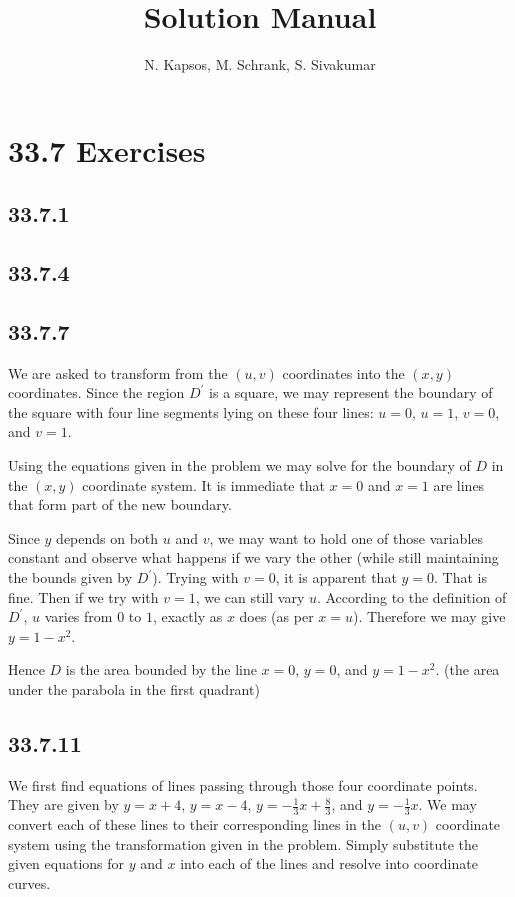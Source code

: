 \documentclass{article}
\title{Solution Manual}
\author{N. Kapsos, M. Schrank, S. Sivakumar}
\date{}
\begin{document}
\maketitle
\setcounter{secnumdepth}{0}

\section{33.7 Exercises}

\subsection{33.7.1}

\subsection{33.7.4}

\subsection{33.7.7}

We are asked to transform from the $(u,v)$ coordinates into the $(x,y)$ coordinates. Since the region $D^{\prime}$ is a square, we may represent the boundary of the square with four line segments lying on these four lines: $u = 0$, $u = 1$, $v = 0$, and $v = 1$.

Using the equations given in the problem we may solve for the boundary of $D$ in the $(x,y)$ coordinate system. It is immediate that $x = 0$ and $x = 1$ are lines that form part of the new boundary.

Since $y$ depends on both $u$ and $v$, we may want to hold one of those variables constant and observe what happens if we vary the other (while still maintaining the bounds given by $D^{\prime}$). Trying with $v = 0$, it is apparent that $y = 0$. That is fine. Then if we try with $v = 1$, we can still vary $u$. According to the definition of $D^{\prime}$, $u$ varies from $0$ to $1$, exactly as $x$ does (as per $x=u$). Therefore we may give $y = 1-x^2$.

Hence $D$ is the area bounded by the line $x=0$, $y=0$, and $y=1-x^2$. (the area under the parabola in the first quadrant)

\subsection{33.7.11}

We first find equations of lines passing through those four coordinate points. They are given by $y=x+4$, $y=x-4$, $y=-\frac{1}{3}x+\frac{8}{3}$, and $y=-\frac{1}{3}x$. We may convert each of these lines to their corresponding lines in the $(u,v)$ coordinate system using the transformation given in the problem. Simply substitute the given equations for $y$ and $x$ into each of the lines and resolve into coordinate curves.
\end{document}
